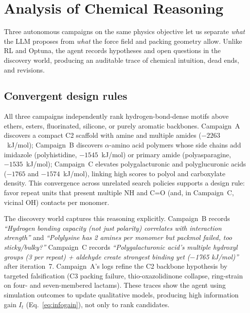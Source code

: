 \documentclass[twocolumn]{fairmeta}
\begin{document}
\section{Analysis of Chemical Reasoning}
\label{sec:analysis}

Three autonomous campaigns on the same physics objective let us separate \emph{what} the LLM proposes from \emph{what} the force field and packing geometry allow.
Unlike RL and Optuna, the agent records hypotheses and open questions in the discovery world, producing an auditable trace of chemical intuition, dead ends, and revisions.

\subsection{Convergent design rules}

All three campaigns independently rank hydrogen-bond-dense motifs above ethers, esters, fluorinated, silicone, or purely aromatic backbones.
Campaign~A discovers a compact C2 scaffold with amine and multiple amides ($-2263$~kJ/mol); Campaign~B discovers $\alpha$-amino acid polymers whose side chains add imidazole (polyhistidine, $-1545$~kJ/mol) or primary amide (polyasparagine, $-1535$~kJ/mol); Campaign~C elevates polygalacturonic and polyglucuronic acids ($-1765$ and $-1574$~kJ/mol), linking high scores to polyol and carboxylate density.
This convergence across unrelated search policies supports a design rule: favor repeat units that present multiple NH and C=O (and, in Campaign~C, vicinal OH) contacts per monomer.

The discovery world captures this reasoning explicitly.
Campaign~B records \textit{``Hydrogen bonding capacity (not just polarity) correlates with interaction strength''} and \textit{``Polylysine has 2 amines per monomer but packmol failed, too sticky/bulky?''}
Campaign~C records \textit{``Polygalacturonic acid's multiple hydroxyl groups (3 per repeat) + aldehyde create strongest binding yet ($-$1765 kJ/mol)''} after iteration~7.
Campaign~A's logs refine the C2 backbone hypothesis by targeted falsification (C3 packing failure, thio-oxazolidinone collapse, ring-strain on four- and seven-membered lactams).
These traces show the agent using simulation outcomes to update qualitative models, producing high information gain $I_t$ (Eq.~\ref{eq:infogain}), not only to rank candidates.
\end{document}
